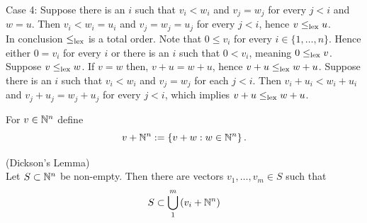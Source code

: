 \begin{example}
\begin{enumerate}
        Case 4: Suppose there is an $i$ such that $v_i<w_i$ and $v_j=w_j$ for every $j<i$ and $w = u$. Then $v_i < w_i = u_i$ and $v_j=w_j = u_j$ for every $j<i$, hence $v\leq_{\text{lex}} u$.\\
        In conclusion $\leq_{\text{lex}}$ is a total order. Note that $0 \leq v_i$ for every $i\in \{1,\dots,n\}$. Hence either $0=v_i$ for every $i$ or there is an $i$ such that $0< v_i$, meaning $0\leq_{\text{lex}} v$. Suppose $v\leq_{\text{lex}} w$. If $v=w$ then, $v+u = w+ u$, hence $v+u\leq_{\text{lex}} w+u$. Suppose there is an $i$ such that $v_i<w_i$ and $v_j = w_j$ for each $j<i$. Then $v_i+u_i < w_i + u_i$ and $v_j+u_j = w_j + u_j$ for every $j<i$, which implies $v + u \leq_{\text{lex}} w + u$. 
    \end{enumerate} 
\end{example}
For $v\in \mathbb{N}^n$ define 
$$v + \mathbb{N}^n := \left\{ v +w  : w\in \mathbb{N}^n\right\}.$$
\begin{theorem}\label{Dickson's lemma}(Dickson's Lemma)\\
    Let $S\subset \mathbb{N}^n$ be non-empty. Then there are vectors $v_1,\dots,v_m\in S$ such that 
    $$S\subset \bigcup_1^m \left(v_i +\mathbb{N}^n\right)$$
\end{theorem}
